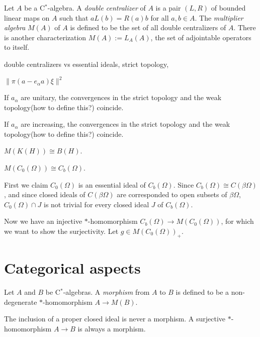 \documentclass{../../large}
\begin{document}
\begin{prb}
Let $A$ be a C$^*$-algebra.
A \emph{double centralizer} of $A$ is a pair $(L,R)$ of bounded linear maps on $A$ such that $aL(b)=R(a)b$ for all $a,b\in A$.
The \emph{multiplier algebra} $M(A)$ of $A$ is defined to be the set of all double centralizers of $A$.
There is another characterization $M(A):=L_A(A)$, the set of adjointable operators to itself.

double centralizers vs essential ideals,
strict topology, 
\begin{parts}
\item $\|\pi(a-e_\alpha a)\xi\|^2$
\item If $a_\alpha$ are unitary, the convergences in the strict topology and the weak topology(how to define this?) coincide.
\item If $a_\alpha$ are increasing, the convergences in the strict topology and the weak topology(how to define this?) coincide.
\item $M(K(H))\cong B(H)$.
\item $M(C_0(\Omega))\cong C_b(\Omega)$.
\end{parts}
\end{prb}
\begin{pf}
First we claim $C_0(\Omega)$ is an essential ideal of $C_b(\Omega)$.
Since $C_b(\Omega)\cong C(\beta\Omega)$, and since closed ideals of $C(\beta\Omega)$ are corresponded to open subsets of $\beta\Omega$, $C_0(\Omega)\cap J$ is not trivial for every closed ideal $J$ of $C_b(\Omega)$.

Now we have an injective $*$-homomorphism $C_b(\Omega)\to M(C_0(\Omega))$, for which we want to show the surjectivity.
Let $g\in M(C_0(\Omega))_+$.
\end{pf}



\section{Categorical aspects}

\begin{prb}[Morphisms]
Let $A$ and $B$ be C$^*$-algebras.
A \emph{morphism} from $A$ to $B$ is defined to be a non-degenerate $*$-homomorphism $A\to M(B)$.
\begin{parts}
\item The inclusion of a proper closed ideal is never a morphism. A surjective $*$-homomorphism $A\to B$ is always a morphism.
\end{parts}
\end{prb}
\end{document}
